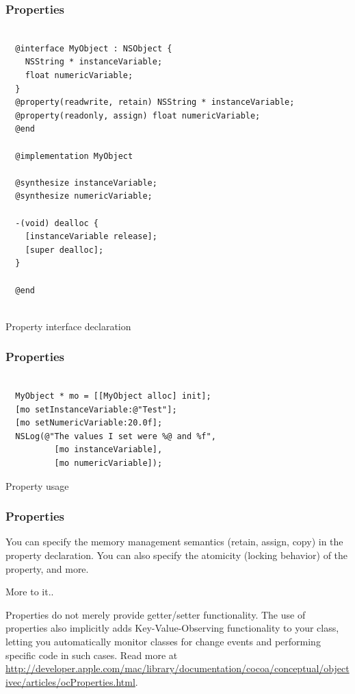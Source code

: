 \documentclass[10pt]{beamer}
\begin{document}
\begin{frame}[fragile]
  \frametitle{Properties}
  \begin{listing}[H]
    \begin{verbatim}

  @interface MyObject : NSObject {
    NSString * instanceVariable;
    float numericVariable;
  }
  @property(readwrite, retain) NSString * instanceVariable;
  @property(readonly, assign) float numericVariable;
  @end

  @implementation MyObject

  @synthesize instanceVariable;
  @synthesize numericVariable;

  -(void) dealloc {
    [instanceVariable release];
    [super dealloc];
  }

  @end 


  \end{verbatim}
    \caption{Property interface declaration}
    \label{listing:11}
  \end{listing}

\end{frame}

\begin{frame}[fragile]
  \frametitle{Properties}
  \begin{listing}[H]
    \begin{verbatim}

  MyObject * mo = [[MyObject alloc] init];
  [mo setInstanceVariable:@"Test"];
  [mo setNumericVariable:20.0f];
  NSLog(@"The values I set were %@ and %f",
          [mo instanceVariable], 
          [mo numericVariable]);

  \end{verbatim}
    \caption{Property usage}
    \label{listing:12}
  \end{listing}

\end{frame}

\begin{frame}[fragile]
  \frametitle{Properties}
  You can specify the memory management semantics (retain, assign, copy) in the property declaration.  You can also specify the atomicity (locking behavior) of the property, and more.
\begin{block}{More to it..}

  Properties do not merely provide getter/setter functionality.  The use of properties
  also implicitly adds Key-Value-Observing functionality to your class, letting
  you automatically monitor classes for change events and performing specific code
  in such cases.  Read more at \url{http://developer.apple.com/mac/library/documentation/cocoa/conceptual/objectivec/articles/ocProperties.html}.

  \end{block}

\end{frame}
\end{document}
